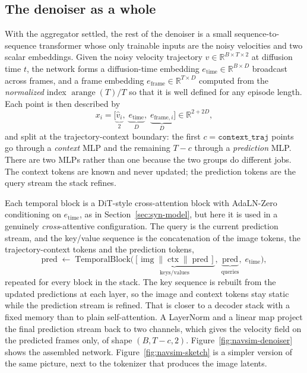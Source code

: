 \subsection{The denoiser as a whole}
\label{sec:navsim-denoiser}

With the aggregator settled, the rest of the denoiser is a small
sequence-to-sequence transformer whose only trainable inputs are the noisy
velocities and two scalar embeddings. Given the noisy velocity trajectory
$\hat v\in\mathbb{R}^{B\times T\times2}$ at diffusion time $t$, the network forms
a diffusion-time embedding $e_{\text{time}}\in\mathbb{R}^{B\times D}$ broadcast
across frames, and a frame embedding $e_{\text{frame}}\in\mathbb{R}^{T\times D}$
computed from the \emph{normalized} index $\operatorname{arange}(T)/T$ so that it
is well defined for any episode length. Each point is then described by
\begin{equation}
x_i=\big[\underbrace{\hat v_i}_{2},\;\underbrace{e_{\text{time}}}_{D},\;
\underbrace{e_{\text{frame},i}}_{D}\big]\in\mathbb{R}^{2+2D},
\label{eq:navsim-input}
\end{equation}
and split at the trajectory-context boundary: the first
$c=\texttt{context\_traj}$ points go through a \emph{context} MLP and the
remaining $T-c$ through a \emph{prediction} MLP. There are two MLPs rather than
one because the two groups do different jobs. The context tokens are known and
never updated; the prediction tokens are the query stream the stack refines.

Each temporal block is a DiT-style cross-attention block with AdaLN-Zero
conditioning on $e_{\text{time}}$, as in Section~\ref{sec:syn-model}, but here it
is used in a genuinely \emph{cross}-attentive configuration. The query is the
current prediction stream, and the key/value sequence is the concatenation of the
image tokens, the trajectory-context tokens and the prediction tokens,
\begin{equation}
\text{pred}\;\leftarrow\;
\text{TemporalBlock}\big(\underbrace{[\,\text{img}\;\|\;\text{ctx}\;\|\;\text{pred}\,]}_{\text{keys/values}},\;
\underbrace{\text{pred}}_{\text{queries}},\; e_{\text{time}}\big),
\label{eq:navsim-block}
\end{equation}
repeated for every block in the stack. The key sequence is rebuilt from the
updated predictions at each layer, so the image and context tokens stay static
while the prediction stream is refined. That is closer to a decoder stack with a
fixed memory than to plain self-attention. A LayerNorm and a linear map project
the final prediction stream back to two channels, which gives the velocity field
on the predicted frames only, of shape $(B,T-c,2)$.
Figure~\ref{fig:navsim-denoiser} shows the assembled network.
Figure~\ref{fig:navsim-sketch} is a simpler version of the same picture, next
to the tokenizer that produces the image latents.

